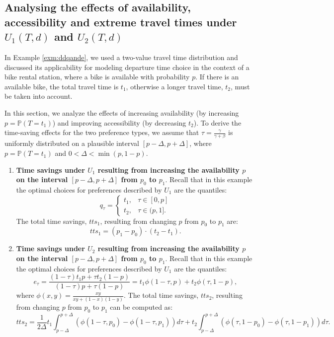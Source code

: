 \documentclass[preprint, 3p, authoryear]{elsarticle} %
\theoremstyle{definition}
\theoremstyle{definition}
\theoremstyle{definition}
\theoremstyle{definition}
\theoremstyle{remark}
\begin{document}
\hypertarget{analysing-the-effects-of-availability-accessibility-and-extreme-travel-times-under-u_1td-and-u_2td}{%
\subsection{\texorpdfstring{Analysing the effects of availability, accessibility and extreme travel times under \(U_1(T,d)\) and \(U_2(T,d)\)}{Analysing the effects of availability, accessibility and extreme travel times under U\_1(T,d) and U\_2(T,d)}}\label{analysing-the-effects-of-availability-accessibility-and-extreme-travel-times-under-u_1td-and-u_2td}}

In Example \ref{exm:ddqande}, we used a two-value travel time distribution and discussed its applicability for modeling departure time choice in the context of a bike rental station, where a bike is available with probability \(p\). If there is an available bike, the total travel time is \(t_1\), otherwise a longer travel time, \(t_2\), must be taken into account.

In this section, we analyze the effects of increasing availability (by increasing \(p=\mathbb P(T=t_1)\)) and improving accessibility (by decreasing \(t_2\)). To derive the time-saving effects for the two preference types, we assume that \(\tau=\frac \gamma{\gamma+\beta}\) is uniformly distributed on a plausible interval \([p-\Delta,p+\Delta]\), where \(p=\mathbb P(T=t_1)\) and \(0<\Delta<\min(p,1-p)\).

\begin{enumerate}
\def\labelenumi{\arabic{enumi})}
\item
  \textbf{Time savings under \(U_1\) resulting from increasing the availability \(p\) on the interval \([p-\Delta,p+\Delta]\) from \(p_0\) to \(p_1\)}. Recall that in this example the optimal choices for preferences described by \(U_1\) are the quantiles:
  \[q_\tau = \begin{cases}t_1,&\tau\in[0,p]\\t_2,&\tau\in(p,1].\end{cases}\]
  The total time savings, \(tts_1\), resulting from changing \(p\) from \(p_0\) to \(p_1\) are:
  \[tts_1=(p_1-p_0)\cdot (t_2-t_1).\]
\item
  \textbf{Time savings under \(U_2\) resulting from increasing the availability \(p\) on the interval \([p-\Delta,p+\Delta]\) from \(p_0\) to \(p_1\)}.
  Recall that in this example the optimal choices for preferences described by \(U_1\) are the quantiles:
  \[e_\tau = \frac{(1-\tau)t_1p+ \tau t_2(1-p)}{(1-\tau)p + \tau(1-p)} = t_1\phi(1-\tau,p)+ t_2\phi(\tau,1-p),\]
  where \(\phi(x,y)=\frac{x y}{xy+(1-x)(1-y)}.\)
  The total time savings, \(tts_2\), resulting from changing \(p\) from \(p_0\) to \(p_1\) can be computed as:
  \[tts_2 = \frac 1{2\Delta}t_1\int_{p-\Delta}^{p+\Delta}\left(\phi(1-\tau,p_0)-\phi(1-\tau,p_1)\right)d\tau + t_2\int_{p-\Delta}^{p+\Delta}\left(\phi(\tau,1-p_0)-\phi(\tau,1-p_1)\right)d\tau.\]
\end{enumerate}
\end{document}
